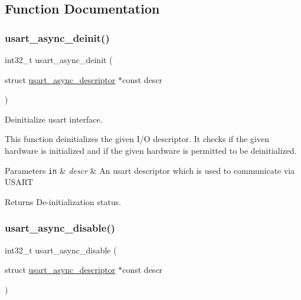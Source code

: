 \subsection{Function Documentation}
\mbox{\label{group__doc__driver__hal__usart__async_gab7ef65ba7b4afd13cb11dcc72315ca43}} 
\subsubsection{\texorpdfstring{usart\+\_\+async\+\_\+deinit()}{usart\_async\_deinit()}}
{\footnotesize\ttfamily int32\+\_\+t usart\+\_\+async\+\_\+deinit (\begin{DoxyParamCaption}\item[{struct \hyperlink{structusart__async__descriptor}{usart\+\_\+async\+\_\+descriptor} $\ast$const}]{descr }\end{DoxyParamCaption})}



Deinitialize usart interface. 

This function deinitializes the given I/O descriptor. It checks if the given hardware is initialized and if the given hardware is permitted to be deinitialized.


\begin{DoxyParams}[1]{Parameters}
\mbox{\tt in}  & {\em descr} & An usart descriptor which is used to communicate via U\+S\+A\+RT\\
\hline
\end{DoxyParams}
\begin{DoxyReturn}{Returns}
De-\/initialization status. 
\end{DoxyReturn}
\mbox{\label{group__doc__driver__hal__usart__async_ga575b7b546a7357088530a9cebf60ad9a}} 
\subsubsection{\texorpdfstring{usart\+\_\+async\+\_\+disable()}{usart\_async\_disable()}}
{\footnotesize\ttfamily int32\+\_\+t usart\+\_\+async\+\_\+disable (\begin{DoxyParamCaption}\item[{struct \hyperlink{structusart__async__descriptor}{usart\+\_\+async\+\_\+descriptor} $\ast$const}]{descr }\end{DoxyParamCaption})}



